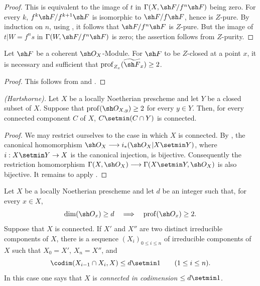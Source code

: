 \begin{proof}

This is equivalent to the image of $t$ in
$\Gamma(X,\sh F/f^n\sh F)$ being zero.  For every $k$,
$f^k\sh F/f^{k+1}\sh F$ is isomorphic to $\sh F/f\sh F$, hence is
$Z$-pure.  By induction on $n$, using , it follows
that $\sh F/f^n\sh F$ is $Z$-pure.  But the image of
$t|W=f^ns$ in $\Gamma(W,\sh F/f^n\sh F)$ is zero; the assertion
follows from $Z$-purity.
\end{proof}

\begin{corollary}[5.10.6]
\label{IV.5.10.6}
Let $\sh F$ be a coherent $\sh O_X$-Module.  For $\sh F$ to be
$Z$-closed at a point $x$, it is necessary and sufficient that $\operatorname{prof}_{Z_x}(\widetilde{\sh F}_x)\geq2$.
\end{corollary}

\begin{proof}
This follows from  and .
\end{proof}

\begin{theorem}[5.10.7]
\label{IV.5.10.7}
\emph{(Hartshorne).}
Let $X$ be a locally Noetherian prescheme and let $Y$ be a closed
subset of $X$.  Suppose that
$\operatorname{prof}(\sh O_{X,y})\geq2$ for every $y\in Y$.
Then, for every connected component $C$ of $X$,
$C\setmin(C\cap Y)$ is connected.
\end{theorem}

\begin{proof}
We may restrict ourselves to the case in which $X$ is connected.
By , the canonical homomorphism $\sh O_X\longrightarrow i_*(\sh O_X|X\setmin Y)$,
where $i:X\setmin Y\to X$ is the canonical injection, is bijective.
Consequently the restriction homomorphism $\Gamma(X,\sh O_X)\longrightarrow\Gamma(X\setmin Y,\sh O_X)$
is also bijective.  It remains to apply
.
\end{proof}

\begin{corollary}[5.10.8]
\label{IV.5.10.8}
Let $X$ be a locally Noetherian prescheme and let $d$ be an
integer such that, for every $x\in X$,
\[
  \dim(\sh O_x)\geq d
  \quad\Longrightarrow\quad
  \operatorname{prof}(\sh O_x)\geq2.
\]
Suppose that $X$ is connected.  If $X'$ and $X''$ are two
distinct irreducible components of $X$, there is a sequence
$(X_i)_{0\leq i\leq n}$ of irreducible components of $X$ such
that $X_0=X'$, $X_n=X''$, and
\[
  \codim(X_{i-1}\cap X_i,X)\leq d\setmin 1
  \qquad(1\leq i\leq n).
\]
\textup{In this case one says that $X$ is
\emph{connected in codimension} $\leq d\setmin 1$.}
\end{corollary}

